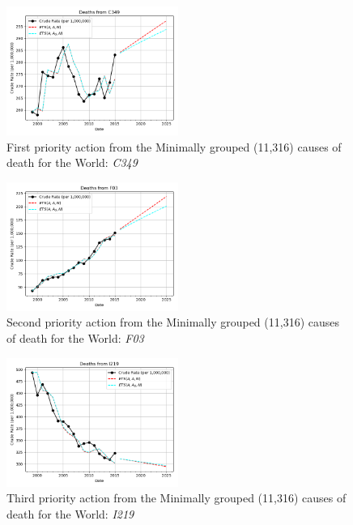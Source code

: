 \documentclass[10pt, a4paper, twocolumn]{IEEEconf}
\begin{document}
\begin{figure}[H]
  \centering
  \includegraphics[width=0.5\textwidth]{results/WORLD_ICD10_MINIMALLY_GROUPED/C349_ets.png}
  \caption{First priority action from the Minimally grouped (11,316) causes of death for the World: \textit{C349}}\label{fig:k8a}
\end{figure}

\begin{figure}[H]
  \centering
  \includegraphics[width=0.5\textwidth]{results/WORLD_ICD10_MINIMALLY_GROUPED/F03_ets.png}
  \caption{Second priority action from the Minimally grouped (11,316) causes of death for the World: \textit{F03}}\label{fig:k8b}
\end{figure}

\begin{figure}[H]
  \centering
  \includegraphics[width=0.5\textwidth]{results/WORLD_ICD10_MINIMALLY_GROUPED/I219_ets.png}
  \caption{Third priority action from the Minimally grouped (11,316) causes of death for the World: \textit{I219}}\label{fig:k8c}
\end{figure}
\end{document}
